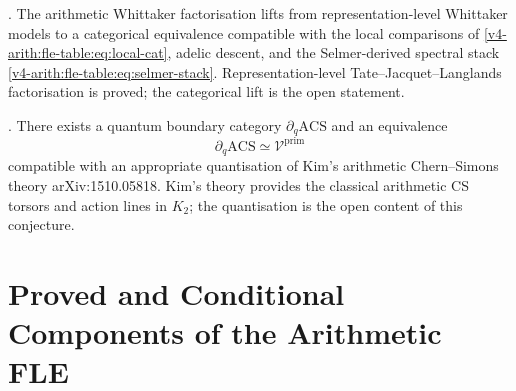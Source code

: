 \begin{conjecture}
\label{v4-arith:fle-table:conj:whittaker}
\ClaimStatusConjectured.
The arithmetic Whittaker factorisation lifts from
representation-level Whittaker models to a categorical equivalence
compatible with the local comparisons of
\eqref{v4-arith:fle-table:eq:local-cat}, adelic descent, and the
Selmer-derived spectral stack
\eqref{v4-arith:fle-table:eq:selmer-stack}.
Representation-level Tate--Jacquet--Langlands factorisation is proved;
the categorical lift is the open statement.
\end{conjecture}

\begin{conjecture}
\label{v4-arith:fle-table:conj:acs-boundary}
\ClaimStatusConjectured. There exists a quantum boundary category
\(\partial_{q}\mathrm{ACS}\) and an equivalence
\[
\partial_{q}\mathrm{ACS} \simeq \mathcal{V}^{\mathrm{prim}}
\]
compatible with an appropriate quantisation of Kim's arithmetic
Chern--Simons theory arXiv:1510.05818. Kim's theory provides the
classical arithmetic CS torsors and action lines in \(K_{2}\); the
quantisation is the open content of this conjecture.
\end{conjecture}

\section{Proved and Conditional Components of the Arithmetic FLE}
\label{v4-arith:fle-table:summary}

